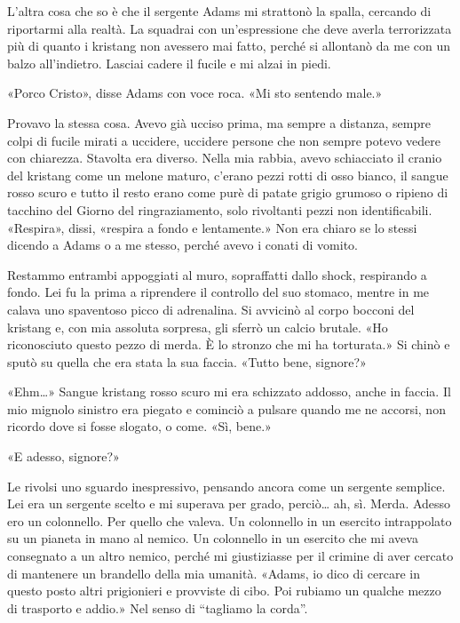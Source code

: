 L'altra cosa che so è che il sergente Adams mi strattonò la spalla,
cercando di riportarmi alla realtà. La squadrai con un'espressione che
deve averla terrorizzata più di quanto i kristang non avessero mai
fatto, perché si allontanò da me con un balzo all'indietro. Lasciai
cadere il fucile e mi alzai in piedi.

«Porco Cristo», disse Adams con voce roca. «Mi sto sentendo male.»

Provavo la stessa cosa. Avevo già ucciso prima, ma sempre a distanza,
sempre colpi di fucile mirati a uccidere, uccidere persone che non
sempre potevo vedere con chiarezza. Stavolta era diverso. Nella mia
rabbia, avevo schiacciato il cranio del kristang come un melone maturo,
c'erano pezzi rotti di osso bianco, il sangue rosso scuro e tutto il
resto erano come purè di patate grigio grumoso o ripieno di tacchino del
Giorno del ringraziamento, solo rivoltanti pezzi non identificabili.
«Respira», dissi, «respira a fondo e lentamente.» Non era chiaro se lo
stessi dicendo a Adams o a me stesso, perché avevo i conati di vomito.

Restammo entrambi appoggiati al muro, sopraffatti dallo shock,
respirando a fondo. Lei fu la prima a riprendere il controllo del suo
stomaco, mentre in me calava uno spaventoso picco di adrenalina. Si
avvicinò al corpo bocconi del kristang e, con mia assoluta sorpresa, gli
sferrò un calcio brutale. «Ho riconosciuto questo pezzo di merda. È lo
stronzo che mi ha torturata.» Si chinò e sputò su quella che era stata
la sua faccia. «Tutto bene, signore?»

«Ehm\ldots» Sangue kristang rosso scuro mi era schizzato addosso, anche
in faccia. Il mio mignolo sinistro era piegato e cominciò a pulsare
quando me ne accorsi, non ricordo dove si fosse slogato, o come. «Sì,
bene.»

«E adesso, signore?»

Le rivolsi uno sguardo inespressivo, pensando ancora come un sergente
semplice. Lei era un sergente scelto e mi superava per grado,
perciò\ldots{} ah, sì. Merda. Adesso ero un colonnello. Per quello che
valeva. Un colonnello in un esercito intrappolato su un pianeta in mano
al nemico. Un colonnello in un esercito che mi aveva consegnato a un
altro nemico, perché mi giustiziasse per il crimine di aver cercato di
mantenere un brandello della mia umanità. «Adams, io dico di cercare in
questo posto altri prigionieri e provviste di cibo. Poi rubiamo un
qualche mezzo di trasporto e addio.» Nel senso di ``tagliamo la corda''.

